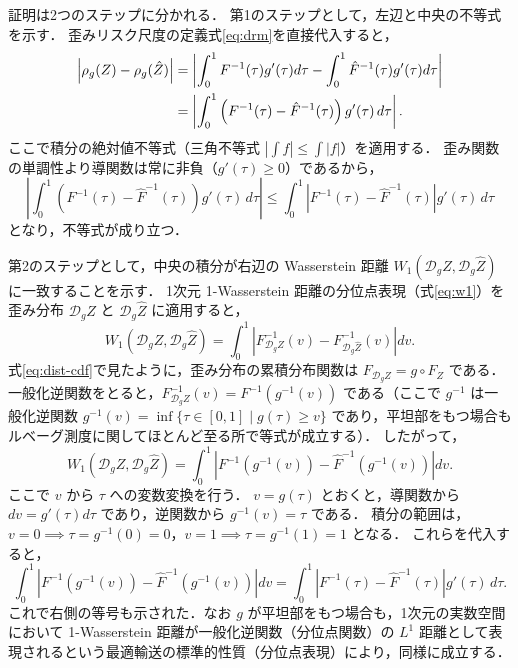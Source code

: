 \documentclass[a4paper,10pt]{jsarticle}
\makeatletter
\theoremstyle{definition}
\renewenvironment{proof}[1][\proofname]{\par
  \pushQED{\qed}%
  \normalfont \topsep6\p@\@plus6\p@\relax
  \trivlist
  \item[\hskip\labelsep\textbf{#1}]\ignorespaces
}{%
  \popQED\endtrivlist\@endpefalse
}
\renewcommand{\proofname}{証明}
\newcommand{\Wone}{W_1}
\renewcommand{\Finv}{F^{-1}}
\newcommand{\Fhinv}{\hat{F}^{-1}}
\newcommand{\dist}{\mathcal{D}_g}
\makeatother
\begin{document}
\begin{proof}
証明は2つのステップに分かれる．
第1のステップとして，左辺と中央の不等式を示す．
歪みリスク尺度の定義式\eqref{eq:drm}を直接代入すると，
\begin{align}
  \left|\rho_g(Z) - \rho_g(\hat Z)\right|
  &= \left| \int_0^1 \Finv(\tau)g'(\tau)d\tau - \int_0^1 \Fhinv(\tau)g'(\tau)d\tau \right| \notag\\
  &= \left| \int_0^1 \left(\Finv(\tau) - \Fhinv(\tau)\right) g'(\tau)\,d\tau \right|.
\end{align}
ここで積分の絶対値不等式（三角不等式 $\left|\int f\right| \le \int |f|$）を適用する．
歪み関数の単調性より導関数は常に非負（$g'(\tau) \ge 0$）であるから，
\begin{equation}
  \left| \int_0^1 \left(\Finv(\tau) - \Fhinv(\tau)\right) g'(\tau)\,d\tau \right| \le \int_0^1 \left|\Finv(\tau) - \Fhinv(\tau)\right| g'(\tau)\,d\tau
\end{equation}
となり，不等式が成り立つ．

第2のステップとして，中央の積分が右辺の Wasserstein 距離 $\Wone(\dist Z, \dist\hat Z)$ に一致することを示す．
1次元 1-Wasserstein 距離の分位点表現（式\eqref{eq:w1}）を歪み分布 $\dist Z$ と $\dist\hat Z$ に適用すると，
\begin{equation}
  \Wone(\dist Z, \dist\hat Z) = \int_0^1 \left| F_{\dist Z}^{-1}(v) - F_{\dist\hat Z}^{-1}(v) \right| dv.
\end{equation}
式\eqref{eq:dist-cdf}で見たように，歪み分布の累積分布関数は $F_{\dist Z} = g \circ F_Z$ である．
一般化逆関数をとると，$F_{\dist Z}^{-1}(v) = \Finv(g^{-1}(v))$ である（ここで $g^{-1}$ は一般化逆関数 $g^{-1}(v)=\inf\{\tau\in[0,1]\mid g(\tau)\ge v\}$ であり，平坦部をもつ場合もルベーグ測度に関してほとんど至る所で等式が成立する）．
したがって，
\begin{equation}
  \Wone(\dist Z, \dist\hat Z) = \int_0^1 \left| \Finv(g^{-1}(v)) - \Fhinv(g^{-1}(v)) \right| dv.
\end{equation}
ここで $v$ から $\tau$ への変数変換を行う．
$v = g(\tau)$ とおくと，導関数から $dv = g'(\tau)d\tau$ であり，逆関数から $g^{-1}(v) = \tau$ である．
積分の範囲は，$v=0 \implies \tau = g^{-1}(0) = 0$，$v=1 \implies \tau = g^{-1}(1) = 1$ となる．
これらを代入すると，
\begin{equation}
  \int_0^1 \left| \Finv(g^{-1}(v)) - \Fhinv(g^{-1}(v)) \right| dv = \int_0^1 \left| \Finv(\tau) - \Fhinv(\tau) \right| g'(\tau)\,d\tau.
\end{equation}
これで右側の等号も示された．なお $g$ が平坦部をもつ場合も，1次元の実数空間において 1-Wasserstein 距離が一般化逆関数（分位点関数）の $L^1$ 距離として表現されるという最適輸送の標準的性質（分位点表現）により，同様に成立する．
\end{proof}
\end{document}
